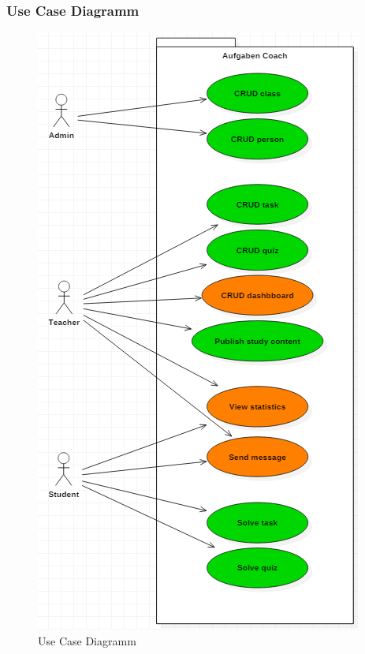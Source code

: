 \subsubsection{Use Case Diagramm}
\begin{minipage}{\textwidth}

\begin{figure}[H]
	\includegraphics[width=\textwidth, height=\textheight, keepaspectratio]{images/UseCaseDiagramm.png}
	\caption{Use Case Diagramm}
\end{figure}

\end{minipage}


